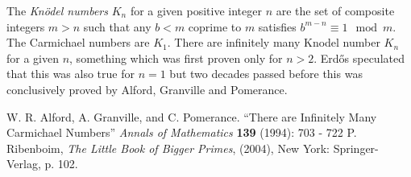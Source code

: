\documentclass[12pt]{article}
\begin{document}
The {\em Kn\"odel numbers} $K_n$ for a given positive integer $n$ are the set of composite integers $m > n$ such that any $b < m$ coprime to $m$ satisfies $b^{m - n} \equiv 1 \mod m$. The Carmichael numbers are $K_1$. There are infinitely many Knodel number $K_n$ for a given $n$, something which was first proven only for $n > 2$. Erd\H{o}s speculated that this was also true for $n = 1$ but two decades passed before this was conclusively proved by Alford, Granville and Pomerance.

\begin{thebibliography}{5}
 W. R. Alford, A. Granville, and C. Pomerance. ``There are Infinitely Many Carmichael Numbers'' {\it Annals of Mathematics} {\bf 139} (1994): 703 - 722 
 P. Ribenboim, {\it The Little Book of Bigger Primes}, (2004), New York: Springer-Verlag, p. 102.
\end{thebibliography}
\end{document}
